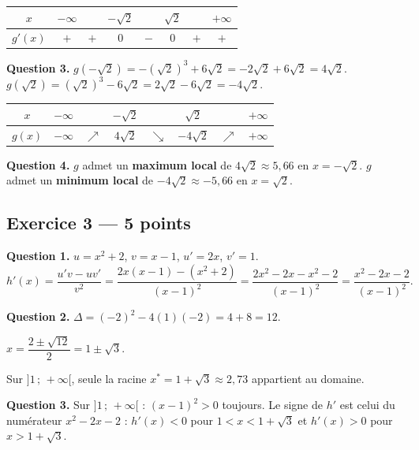 \begin{center}
\begin{tabular}{|c|ccccccc|}
\hline
$x$ & $-\infty$ & & $-\sqrt{2}$ & & $\sqrt{2}$ & & $+\infty$ \\
\hline
$g'(x)$ & $+$ & $+$ & $0$ & $-$ & $0$ & $+$ & $+$ \\
\hline
\end{tabular}
\end{center}

\textbf{Question 3.}
$g(-\sqrt{2}) = -(\sqrt{2})^3 + 6\sqrt{2} = -2\sqrt{2} + 6\sqrt{2} = 4\sqrt{2}.$
$g(\sqrt{2}) = (\sqrt{2})^3 - 6\sqrt{2} = 2\sqrt{2} - 6\sqrt{2} = -4\sqrt{2}.$

\begin{center}
\begin{tabular}{|c|ccccccc|}
\hline
$x$ & $-\infty$ & & $-\sqrt{2}$ & & $\sqrt{2}$ & & $+\infty$ \\
\hline
$g(x)$ & $-\infty$ & $\nearrow$ & $4\sqrt{2}$ & $\searrow$ & $-4\sqrt{2}$ & $\nearrow$ & $+\infty$ \\
\hline
\end{tabular}
\end{center}

\textbf{Question 4.}
$g$ admet un \textbf{maximum local} de $4\sqrt{2} \approx 5{,}66$ en $x = -\sqrt{2}$.
$g$ admet un \textbf{minimum local} de $-4\sqrt{2} \approx -5{,}66$ en $x = \sqrt{2}$.

\subsection*{Exercice 3 — 5 points}


\textbf{Question 1.}
$u = x^2 + 2$, $v = x-1$, $u' = 2x$, $v' = 1$.
\[
h'(x) = \frac{u'v - uv'}{v^2} = \frac{2x(x-1) - (x^2+2)}{(x-1)^2} = \frac{2x^2 - 2x - x^2 - 2}{(x-1)^2} = \frac{x^2 - 2x - 2}{(x-1)^2}.
\]

\textbf{Question 2.}
$\Delta = (-2)^2 - 4(1)(-2) = 4 + 8 = 12.$

$x = \dfrac{2 \pm \sqrt{12}}{2} = 1 \pm \sqrt{3}.$

Sur $]1\,;\,+\infty[$, seule la racine $x^* = 1 + \sqrt{3} \approx 2{,}73$ appartient au domaine.

\textbf{Question 3.}
Sur $]1\,;\,+\infty[$ : $(x-1)^2 > 0$ toujours. Le signe de $h'$ est celui du numérateur $x^2-2x-2$ :
$h'(x) < 0$ pour $1 < x < 1+\sqrt{3}$ et $h'(x) > 0$ pour $x > 1+\sqrt{3}$.

